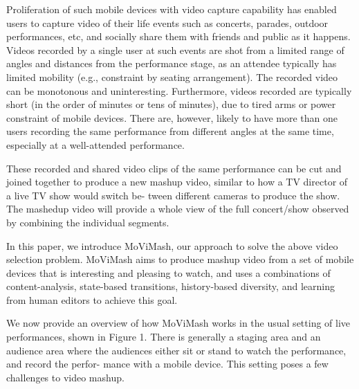 \documentclass{sig-alternate}
\begin{document}
Proliferation of such mobile devices with video capture capability has enabled users to capture video of their life events such
as concerts, parades, outdoor performances, etc, and socially share
them with friends and public as it happens. Videos recorded by
a single user at such events are shot from a limited range of angles and distances from the performance stage, as an attendee typically has limited mobility (e.g., constraint by seating arrangement).
The recorded video can be monotonous and uninteresting. Furthermore, videos recorded are typically short (in the order of minutes
or tens of minutes), due to tired arms or power constraint of mobile
devices. There are, however, likely to have more than one users
recording the same performance from different angles at the same
time, especially at a well-attended performance.

These recorded and shared video clips of the same performance
can be cut and joined together to produce a new mashup video,
similar to how a TV director of a live TV show would switch be-
tween different cameras to produce the show. The mashedup video will provide a whole view of the full concert/show observed by combining the individual segments.

In this paper, we introduce MoViMash, our approach to solve
the above video selection problem. MoViMash aims to produce
mashup video from a set of mobile devices that is interesting and
pleasing to watch, and uses a combinations of content-analysis,
state-based transitions, history-based diversity, and learning from
human editors to achieve this goal.

We now provide an overview of how MoViMash works in the
usual setting of live performances, shown in Figure 1. There is
generally a staging area and an audience area where the audiences
either sit or stand to watch the performance, and record the perfor-
mance with a mobile device. This setting poses a few challenges to
video mashup.
\end{document}
